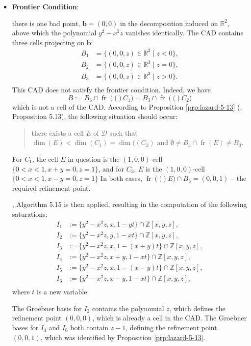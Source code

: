 \documentclass[
]{book}
\theoremstyle{definition}
\theoremstyle{definition}
\theoremstyle{definition}
\theoremstyle{definition}
\theoremstyle{remark}
\begin{document}
\begin{itemize}
\item
  \textbf{Frontier Condition}:

  there is one bad point, \(\mathbf{b} = (0,0)\) in the decomposition induced on \(\mathbb{R}^2\), above which the polynomial \(y^2 - x^2 z\) vanishes identically.
  The CAD contains three cells projecting on \(\mathbf{b}\):
  \begin{align}
  B_1 &= \{ (0,0,z) \in \mathbb{R}^3 \mid z < 0 \},\\
  B_2 &= \{ (0,0,z) \in \mathbb{R}^3 \mid z = 0 \},\\
  B_3 &= \{ (0,0,z) \in \mathbb{R}^3 \mid z > 0 \}.\\
  \end{align}
  This CAD does not satisfy the frontier condition.
  Indeed, we have
  \[
  B := B_3 \cap {\operatorname{fr} \left( ( \right)}C_1) = B_3 \cap {\operatorname{fr} \left( ( \right)}C_2)
  \] which is not a cell of the CAD.
  According to Proposition \ref{prp:lazard-5-13} (\citet{lazard10}, Proposition 5.13), the following situation should occur:

  \begin{quote}
  there exists a cell \(E\) of \(\mathcal{D}\) such that \(\dim(E) < \dim(C_1) = \dim((C_2)\) and \(\emptyset \neq B_3 \cap {\operatorname{fr} \left(  E  \right)} \neq B_3\).
  \end{quote}

  For \(C_1\), the cell \(E\) in question is the \((1,0,0)\)-cell \(\{ 0 < x < 1, x + y = 0, z = 1 \}\),
  and for \(C_3\), \(E\) is the \((1,0,0)\)-cell \(\{ 0 < x < 1, x - y = 0, z = 1 \}\)
  In both cases, \({\operatorname{fr} \left( ( \right)}E) \cap B_3 = (0,0,1)\) -- the required refinement point.

  \citet{lazard10}, Algorithm 5.15 is then applied, resulting in the computation of the following saturations:
  \begin{align}
  I_1 &:= \{ y^2 - x^2 z, x, 1 - y t \} \cap \mathbb{Z}[x,y,z], \\
  I_2 &:= \{ y^2 - x^2 z, y, 1 - x t \} \cap \mathbb{Z}[x,y,z], \\
  I_3 &:= \{ y^2 - x^2 z, x, 1 - (x + y) t \} \cap \mathbb{Z}[x,y,z], \\
  I_4 &:= \{ y^2 - x^2 z, x + y, 1 - x t \} \cap \mathbb{Z}[x,y,z], \\
  I_5 &:= \{ y^2 - x^2 z, x, 1 - (x - y) t \} \cap \mathbb{Z}[x,y,z], \\
  I_6 &:= \{ y^2 - x^2 z, x - y, 1 - x t \} \cap \mathbb{Z}[x,y,z], \\
  \end{align}
  where \(t\) is a new variable.

  The Groebner basis for \(I_2\) contains the polynomial \(z\), which defines the refinement point \((0,0,0)\), which is already a cell in the CAD.
  The Groebner bases for \(I_4\) and \(I_6\) both contain \(z-1\), defining the refinement point \((0,0,1)\), which was
  identified by Proposition \ref{prp:lazard-5-13}.
\end{itemize}
\end{document}
